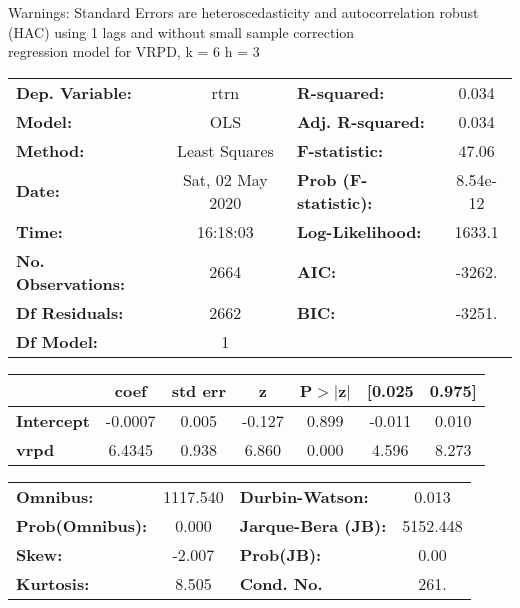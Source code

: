Warnings: \newline
 [1] Standard Errors are heteroscedasticity and autocorrelation robust (HAC) using 1 lags and without small sample correction\\ 

regression model for VRPD, k = 6 h = 3\begin{center}
\begin{tabular}{lclc}
\toprule
\textbf{Dep. Variable:}    &       rtrn       & \textbf{  R-squared:         } &     0.034   \\
\textbf{Model:}            &       OLS        & \textbf{  Adj. R-squared:    } &     0.034   \\
\textbf{Method:}           &  Least Squares   & \textbf{  F-statistic:       } &     47.06   \\
\textbf{Date:}             & Sat, 02 May 2020 & \textbf{  Prob (F-statistic):} &  8.54e-12   \\
\textbf{Time:}             &     16:18:03     & \textbf{  Log-Likelihood:    } &    1633.1   \\
\textbf{No. Observations:} &        2664      & \textbf{  AIC:               } &    -3262.   \\
\textbf{Df Residuals:}     &        2662      & \textbf{  BIC:               } &    -3251.   \\
\textbf{Df Model:}         &           1      & \textbf{                     } &             \\
\bottomrule
\end{tabular}
\begin{tabular}{lcccccc}
                   & \textbf{coef} & \textbf{std err} & \textbf{z} & \textbf{P$> |$z$|$} & \textbf{[0.025} & \textbf{0.975]}  \\
\midrule
\textbf{Intercept} &      -0.0007  &        0.005     &    -0.127  &         0.899        &       -0.011    &        0.010     \\
\textbf{vrpd}      &       6.4345  &        0.938     &     6.860  &         0.000        &        4.596    &        8.273     \\
\bottomrule
\end{tabular}
\begin{tabular}{lclc}
\textbf{Omnibus:}       & 1117.540 & \textbf{  Durbin-Watson:     } &    0.013  \\
\textbf{Prob(Omnibus):} &   0.000  & \textbf{  Jarque-Bera (JB):  } & 5152.448  \\
\textbf{Skew:}          &  -2.007  & \textbf{  Prob(JB):          } &     0.00  \\
\textbf{Kurtosis:}      &   8.505  & \textbf{  Cond. No.          } &     261.  \\
\bottomrule
\end{tabular}
\end{center}


